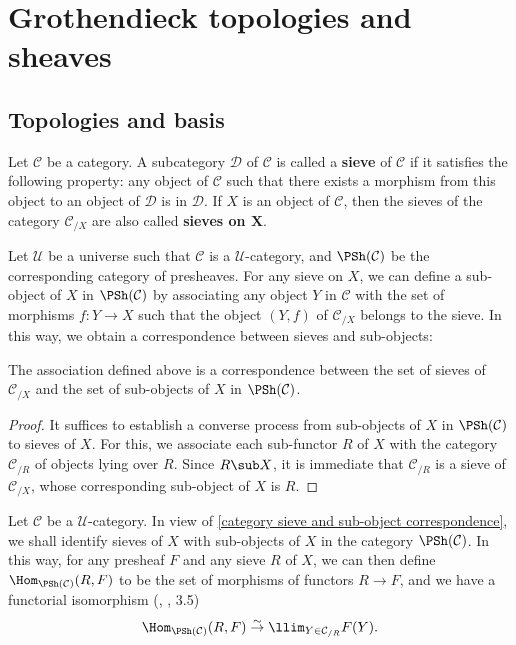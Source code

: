 \section{Grothendieck topologies and sheaves}
\subsection{Topologies and basis}
Let $\mathcal{C}$ be a category. A subcategory $\mathcal{D}$ of $\mathcal{C}$ is called a \textbf{sieve} of $\mathcal{C}$ if it satisfies the following property: any object of $\mathcal{C}$ such that there exists a morphism from this object to an object of $\mathcal{D}$ is in $\mathcal{D}$. If $X$ is an object of $\mathcal{C}$, then the sieves of the category $\mathcal{C}_{/X}$ are also called \textbf{sieves on $\bm{X}$}.\par
Let $\mathscr{U}$ be a universe such that $\mathcal{C}$ is a $\mathscr{U}$-category, and $\PSh(\mathcal{C})$ be the corresponding category of presheaves. For any sieve on $X$, we can define a sub-object of $X$ in $\PSh(\mathcal{C})$ by associating any object $Y$ in $\mathcal{C}$ with the set of morphisms $f:Y\to X$ such that the object $(Y,f)$ of $\mathcal{C}_{/X}$ belongs to the sieve. In this way, we obtain a correspondence between sieves and sub-objects:
\begin{proposition}\label{category sieve and subobject correspondence}
The association defined above is a correspondence between the set of sieves of $\mathcal{C}_{/X}$ and the set of sub-objects of $X$ in $\PSh(\mathcal{C})$.
\end{proposition}
\begin{proof}
It suffices to establish a converse process from sub-objects of $X$ in $\PSh(\mathcal{C})$ to sieves of $X$. For this, we associate each sub-functor $R$ of $X$ with the category $\mathcal{C}_{/R}$ of objects lying over $R$. Since $R\sub X$, it is immediate that $\mathcal{C}_{/R}$ is a sieve of $\mathcal{C}_{/X}$, whose corresponding sub-object of $X$ is $R$.
\end{proof}
Let $\mathcal{C}$ be a $\mathscr{U}$-category. In view of \cref{category sieve and sub-object correspondence}, we shall identify sieves of $X$ with sub-objects of $X$ in the category $\PSh(\mathcal{C})$. In this way, for any presheaf $F$ and any sieve $R$ of $X$, we can then define $\Hom_{\PSh(\mathcal{C})}(R,F)$ to be the set of morphisms of functors $R\to F$, and we have a functorial isomorphism (\cite{SGA4-1}, , 3.5)
\begin{equation}\label{category Hom of functors char by limit}
\Hom_{\PSh(\mathcal{C})}(R,F) \stackrel{\sim}{\to } \llim_{Y\in\mathcal{C}_{/R}}F(Y).
\end{equation}
